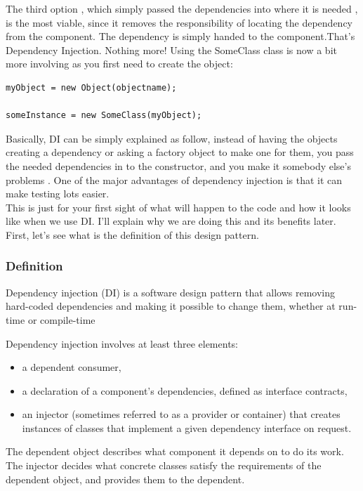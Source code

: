\documentclass[14pt,a4paper]{extreport}
\begin{document}
The third option , which simply passed the dependencies into where it is needed , is the most viable, since it removes the responsibility of locating the dependency from the component. The dependency is simply handed to the component.That's Dependency Injection. Nothing more! Using the SomeClass class is now a bit more 
involving as you first need to create the object:
\begin{verbatim}
myObject = new Object(objectname);

someInstance = new SomeClass(myObject);
\end{verbatim}
Basically, DI can be simply explained as follow, instead of having the objects creating a dependency or asking a factory object to make one for them, you pass the needed dependencies in to the constructor, and you make it somebody else's problems . One of the major advantages of dependency injection is that it can make testing lots easier. 
\\

This is just for your first sight of what will happen to the code and how it looks like when we use DI. I’ll explain why we are doing this and its benefits later. First, let’s see what is the definition of this design pattern.

			\subsubsection{Definition}
			Dependency injection (DI) is a software design pattern that allows removing hard-coded dependencies and making it possible to change them, whether at run-time or compile-time\cite{wikiDI}

Dependency injection involves at least three elements:
\begin{itemize}
\item a dependent consumer,
\item a declaration of a component's dependencies, defined as interface contracts,
\item an injector (sometimes referred to as a provider or container) that creates instances of classes that implement a given dependency interface on request.
\end{itemize}

The dependent object describes what component it depends on to do its work. The injector decides what concrete classes satisfy the requirements of the dependent object, and provides them to the dependent.
\\
\end{document}
